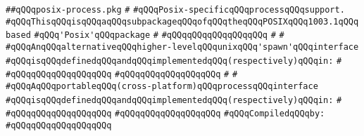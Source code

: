 \label{src/lib/std/src/psx/posix-process.pkg}
\verb|##qQQqposix-process.pkg|\newline
\verb|#|\newline
\verb|#qQQqPosix-specificqQQqprocessqQQqsupport.|\newline
\verb|#qQQqThisqQQqisqQQqaqQQqsubpackageqQQqofqQQqtheqQQqPOSIXqQQq1003.1qQQqbased|\newline
\verb|#qQQq'Posix'qQQqpackage|\newline
\verb|#|\newline
\verb|#qQQqqQQqqQQqqQQqqQQq|\newline
\verb|#|\newline
\verb|#|\newline
\verb|#qQQqAnqQQqalternativeqQQqhigher-levelqQQqunixqQQq'spawn'qQQqinterface|\newline
\verb|#qQQqisqQQqdefinedqQQqandqQQqimplementedqQQq(respectively)qQQqin:|\newline
\verb|#|\newline
\verb|#qQQqqQQqqQQqqQQqqQQq|\newline
\verb|#qQQqqQQqqQQqqQQqqQQq|\newline
\verb|#|\newline
\verb|#|\newline
\verb|#qQQqAqQQqportableqQQq(cross-platform)qQQqprocessqQQqinterface|\newline
\verb|#qQQqisqQQqdefinedqQQqandqQQqimplementedqQQq(respectively)qQQqin:|\newline
\verb|#|\newline
\verb|#qQQqqQQqqQQqqQQqqQQq|\newline
\verb|#qQQqqQQqqQQqqQQqqQQq|\newline
\newline
\verb|#qQQqCompiledqQQqby:|\newline
\verb|#qQQqqQQqqQQqqQQqqQQq|\newline
